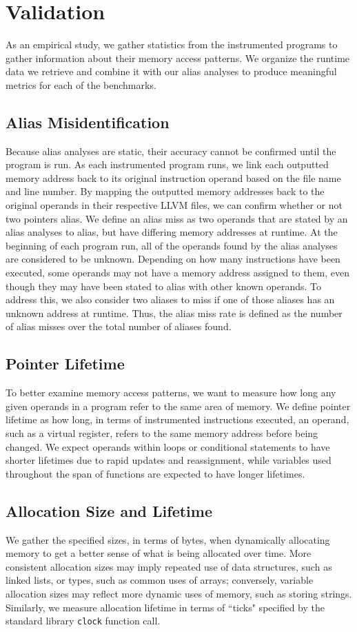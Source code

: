 \chapter{Validation}

As an empirical study, we gather statistics from the instrumented programs to gather information about their memory access patterns. We organize the runtime data we retrieve and combine it with our alias analyses to produce meaningful metrics for each of the benchmarks.

\section{Alias Misidentification}
Because alias analyses are static, their accuracy cannot be confirmed until the program is run. As each instrumented program runs, we link each outputted memory address back to its original instruction operand based on the file name and line number. By mapping the outputted memory addresses back to the original operands in their respective LLVM files, we can confirm whether or not two pointers alias. We define an alias miss as two operands that are stated by an alias analyses to alias, but have differing memory addresses at runtime. At the beginning of each program run, all of the operands found by the alias analyses are considered to be unknown. Depending on how many instructions have been executed, some operands may not have a memory address assigned to them, even though they may have been stated to alias with other known operands. To address this, we also consider two aliases to miss if one of those aliases has an unknown address at runtime. Thus, the alias miss rate is defined as the number of alias misses over the total number of aliases found.

\section{Pointer Lifetime}
To better examine memory access patterns, we want to measure how long any given operands in a program refer to the same area of memory. We define pointer lifetime as how long, in terms of instrumented instructions executed, an operand, such as a virtual register, refers to the same memory address before being changed. We expect operands within loops or conditional statements to have shorter lifetimes due to rapid updates and reassignment, while variables used throughout the span of functions are expected to have longer lifetimes.

\section{Allocation Size and Lifetime}
We gather the specified sizes, in terms of bytes, when dynamically allocating memory to get a better sense of what is being allocated over time. More consistent allocation sizes may imply repeated use of data structures, such as linked lists, or types, such as common uses of arrays; conversely, variable allocation sizes may reflect more dynamic uses of memory, such as storing strings. Similarly, we measure allocation lifetime in terms of ``ticks" specified by the standard library \texttt{clock} function call.
